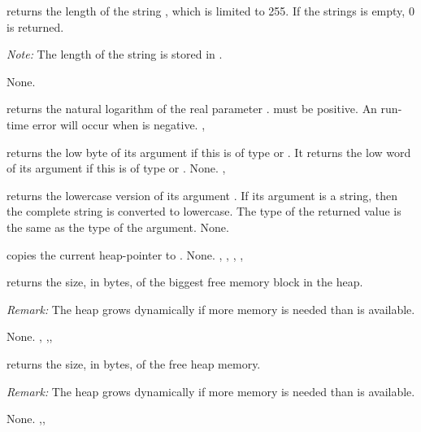 \documentclass{report}
\begin{document}


{ returns the length of the string ,
which is limited to 255. If the strings  is empty, 0 is returned.

{\em Note:} The length of the string  is stored in .
}
{None.}
{}



{
 returns the natural logarithm of the real parameter .
 must be positive.
}
{An run-time error will occur when  is negative.}
{, }



{ returns the low byte of its argument if this is of type
 or
. It returns the low word of its argument if this is of type 
 or .}
{None.}
{, }



{ returns the lowercase version of its argument .
If its argument is a string, then the complete string is converted to
lowercase. The type of the returned value is the same as the type of the
argument.}
{None.}
{}



{ copies the current heap-pointer to .}
{None.}
{, , , , }



{ returns the size, in bytes, of the biggest free memory block in
the heap.

{\em Remark:} The heap grows dynamically if more memory is needed than is
available.}
{None.}
{, ,, }



{ returns the size, in bytes, of the free heap memory.

{\em Remark:} The heap grows dynamically if more memory is needed than is
available.}
{None.}
{,, }
\end{document}

